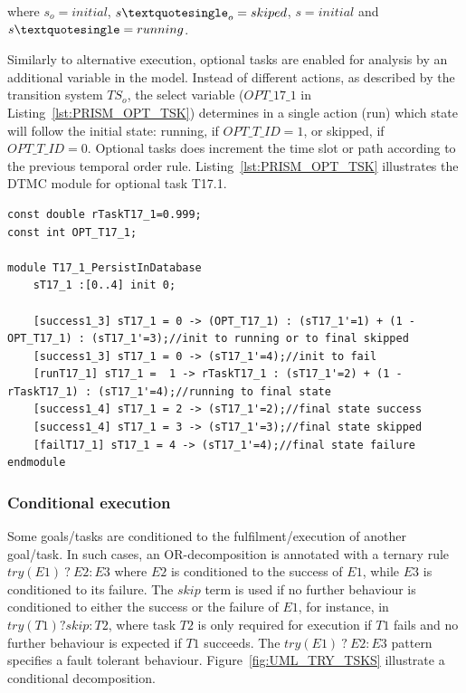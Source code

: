 \noindent
where $s_o = initial$, $s\textquotesingle_o = skiped$, $s = initial$ and $s\textquotesingle = running$.
\medskip

Similarly to alternative execution, optional tasks are enabled for analysis by an additional variable in the model. Instead of different actions, as described by the transition system $TS_o$, the select variable ($OPT\_17\_1$ in Listing~\ref{lst:PRISM_OPT_TSK}) determines in a single action (run) which state will follow the initial state: running, if $OPT\_T\_ID=1$, or skipped, if $OPT\_T\_ID=0$. Optional tasks does increment the time slot or path according to the previous temporal order rule. Listing~\ref{lst:PRISM_OPT_TSK} illustrates the DTMC module for optional task T17.1. 
\medskip

\begin{lstlisting}[language=Prism, caption={An optional task T17.1 as a DTMC module with additional select variable OPT\_T17\_1.},label={lst:PRISM_OPT_TSK}] 
const double rTaskT17_1=0.999;
const int OPT_T17_1;

module T17_1_PersistInDatabase
	sT17_1 :[0..4] init 0;
	
	[success1_3] sT17_1 = 0 -> (OPT_T17_1) : (sT17_1'=1) + (1 - OPT_T17_1) : (sT17_1'=3);//init to running or to final skipped
	[success1_3] sT17_1 = 0 -> (sT17_1'=4);//init to fail
	[runT17_1] sT17_1 =  1 -> rTaskT17_1 : (sT17_1'=2) + (1 - rTaskT17_1) : (sT17_1'=4);//running to final state
	[success1_4] sT17_1 = 2 -> (sT17_1'=2);//final state success
	[success1_4] sT17_1 = 3 -> (sT17_1'=3);//final state skipped
	[failT17_1] sT17_1 = 4 -> (sT17_1'=4);//final state failure
endmodule
\end{lstlisting}

\subsubsection{Conditional execution}

Some goals/tasks are conditioned to the fulfilment/execution of another goal/task. In such cases, an OR-decomposition is annotated with a ternary rule $try(E1)\ ?\ E2:E3$ where $E2$ is conditioned to the success of $E1$, while $E3$ is conditioned to its failure. The $skip$ term is used if no further behaviour is conditioned to either the success or the failure of $E1$, for instance, in $try(T1)?skip:T2$, where task $T2$ is only required for execution if $T1$ fails and no further behaviour is expected if $T1$ succeeds. The $try(E1)\ ?\ E2:E3$ pattern specifies a fault tolerant behaviour. Figure~\ref{fig:UML_TRY_TSKS} illustrate a conditional decomposition.

